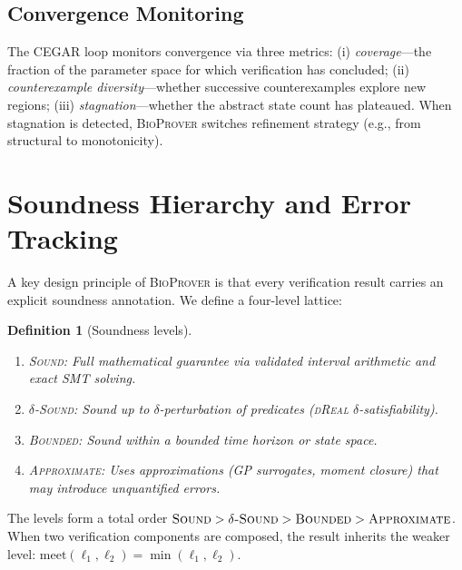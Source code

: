 \documentclass[11pt]{article}
\newtheorem{definition}[theorem]{Definition}
\newcommand{\bioprover}{\textsc{BioProver}}
\newcommand{\cegar}{\textsc{CEGAR}}
\newcommand{\dreal}{\textsc{dReal}}
\begin{document}
\subsection{Convergence Monitoring}

The \cegar{} loop monitors convergence via three metrics: (i)
\emph{coverage}---the fraction of the parameter space for which
verification has concluded; (ii) \emph{counterexample
diversity}---whether successive counterexamples explore new regions;
(iii) \emph{stagnation}---whether the abstract state count has
plateaued. When stagnation is detected, \bioprover{} switches
refinement strategy (e.g., from structural to monotonicity).

\section{Soundness Hierarchy and Error Tracking}
\label{sec:soundness}

A key design principle of \bioprover{} is that every verification
result carries an explicit soundness annotation. We define a
four-level lattice:

\begin{definition}[Soundness levels]
\label{def:soundness}
\begin{enumerate}[leftmargin=*,itemsep=1pt]
\item \textsc{Sound}: Full mathematical guarantee via validated
  interval arithmetic and exact SMT solving.
\item \textsc{$\delta$-Sound}: Sound up to $\delta$-perturbation of
  predicates (\dreal{} $\delta$-satisfiability).
\item \textsc{Bounded}: Sound within a bounded time horizon or state
  space.
\item \textsc{Approximate}: Uses approximations (GP surrogates,
  moment closure) that may introduce unquantified errors.
\end{enumerate}
\end{definition}

The levels form a total order $\textsc{Sound} > \textsc{$\delta$-Sound}
> \textsc{Bounded} > \textsc{Approximate}$. When two verification
components are composed, the result inherits the weaker level:
$\text{meet}(\ell_1, \ell_2) = \min(\ell_1, \ell_2)$.
\end{document}
